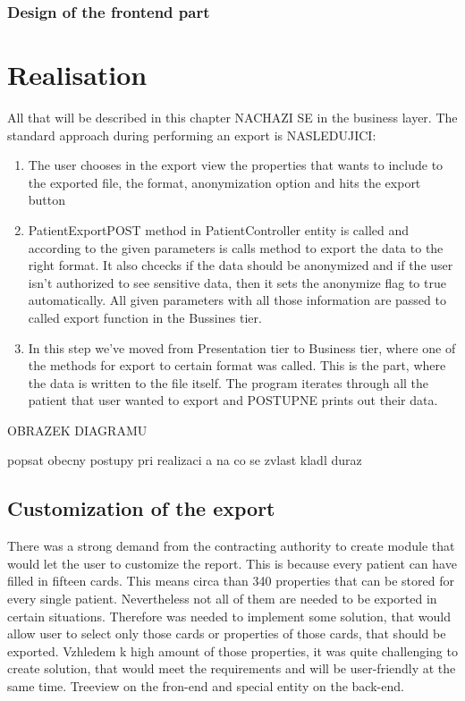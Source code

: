\documentclass[thesis=B,english]{FITthesis}[2012/10/20]
\begin{document}
\subsection{Design of the frontend part}


	\chapter{Realisation}
All that will be described in this chapter NACHAZI SE in the business layer. The standard approach during performing an export is NASLEDUJICI:

\begin{enumerate}
\item{ The user chooses in the export view the properties that wants to include to the exported file, the format, anonymization option and hits the export button }
\item{ PatientExportPOST method in PatientController entity is called and according to the given parameters is calls method to export the data to the right format. It also chcecks if the data should be anonymized and if the user isn't authorized to see sensitive data, then it sets the anonymize flag to true automatically. All given parameters with all those information are passed to called export function in the Bussines tier.}
\item{ In this step we've moved from Presentation tier to Business tier, where one of the methods for export to certain format was called. This is the part, where the data is written to the file itself. The program iterates through all the patient that user wanted to export and POSTUPNE prints out their data.
}

\end{enumerate}


OBRAZEK DIAGRAMU

popsat obecny postupy pri realizaci a na co se zvlast kladl duraz
\section{Customization of the export}
There was a strong demand from the contracting authority to create module that would  let the user to customize the report. This is because every patient can have filled in fifteen cards. This means circa than 340 properties that can be stored for every single patient. Nevertheless not all of them are needed to be exported in certain situations. Therefore was needed to implement some solution, that would allow user to select only those cards or properties of those cards, that should be exported.
Vzhledem k high amount of those properties, it was quite challenging to create solution, that would meet the requirements and will be user-friendly at the same time. Treeview on the fron-end and special entity on the back-end.
\end{document}
